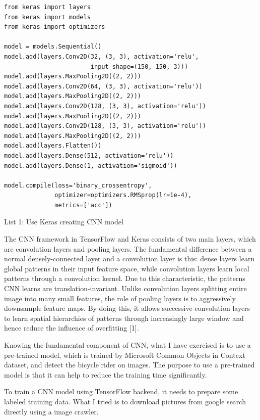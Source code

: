 \documentclass[titlepage]{article}
\begin{document}
\begin{listing}
\begin{verbatim}
from keras import layers
from keras import models
from keras import optimizers

model = models.Sequential()
model.add(layers.Conv2D(32, (3, 3), activation='relu',
                        input_shape=(150, 150, 3)))
model.add(layers.MaxPooling2D((2, 2)))
model.add(layers.Conv2D(64, (3, 3), activation='relu'))
model.add(layers.MaxPooling2D((2, 2)))
model.add(layers.Conv2D(128, (3, 3), activation='relu'))
model.add(layers.MaxPooling2D((2, 2)))
model.add(layers.Conv2D(128, (3, 3), activation='relu'))
model.add(layers.MaxPooling2D((2, 2)))
model.add(layers.Flatten())
model.add(layers.Dense(512, activation='relu'))
model.add(layers.Dense(1, activation='sigmoid'))

model.compile(loss='binary_crossentropy',
              optimizer=optimizers.RMSprop(lr=1e-4),
              metrics=['acc'])
\end{verbatim}
\centering
\caption{List 1: Use Keras creating CNN model}
\newline
\end{listing}

The CNN framework in TensorFlow and Keras consists of two main layers, which
are convolution layers and pooling layers. The fundamental difference between
a normal densely-connected layer and a convolution layer is this: dense
layers learn global patterns in their input feature space, while convolution
layers learn local patterns through a convolution kernel. Due to this
characteristic, the patterns CNN learns are translation-invariant. Unlike
convolution layers splitting entire image into many small features, the role
of pooling layers is to aggressively downsample feature maps. By doing this,
it allows successive convolution layers to learn spatial hierarchies of
patterns through increasingly large window and hence reduce the influence of
overfitting [1].

Knowing the fundamental component of CNN, what I have exercised is to use a
pre-trained model, which is trained by Microsoft Common Objects in Context
dataset, and detect the bicycle rider on images. The purpose to use a
pre-trained model is that it can help to reduce the training time
significantly.

To train a CNN model using TensorFlow backend, it needs to prepare some
labeled training data. What I tried is to download pictures from google
search directly using a image crawler.
\end{document}
